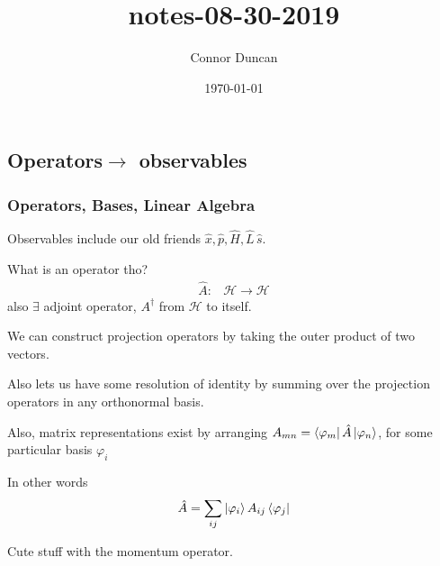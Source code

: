 \documentclass{article}
\author{Connor Duncan}
\date{\today}
\title{notes-08-30-2019}
\theoremstyle{definition}
\begin{document}
\subsection{Operators$\rightarrow$ observables}
\subsubsection{Operators, Bases, Linear Algebra}
Observables include our old friends $\hat x,\hat p,\hat H, \hat L\,\hat s$.

What is an operator tho? 
\begin{equation}
	\begin{matrix}
		\hat A:		&	\mathcal H\rightarrow\mathcal H
	\end{matrix}
\end{equation}
also $\exists$ adjoint operator, $A^{\dag}$ from $\mathcal H$ to itself.

We can construct projection operators by taking the outer product of two vectors.

Also lets us have some resolution of identity by summing over the projection operators in any orthonormal basis.

Also, matrix representations exist by arranging $A_{mn}=\bra{\varphi_m}\hat A\ket{\varphi_n}$, for some particular basis $\varphi_i$

In other words
\begin{equation}
	\hat A=\sum_{ij}\ket{\varphi_i}A_{ij}\bra{\varphi_j}
\end{equation}

Cute stuff with the momentum operator.
\end{document}

